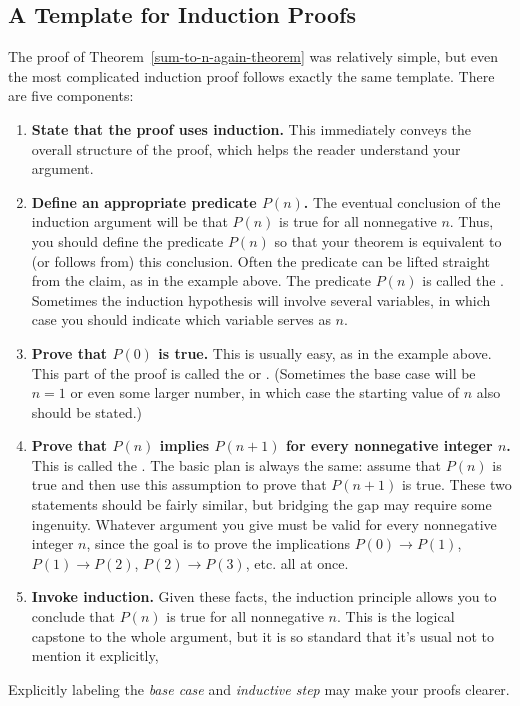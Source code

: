 \iffalse
In effect, we've just proved
that $P(0)$ implies $P(1)$, $P(1)$ implies $P(2)$, $P(2)$ implies
$P(3)$, etc., all in one fell swoop.
\fi

\subsection{A Template for Induction Proofs}
\label{templ-induct-proofs}

The proof of Theorem~\ref{sum-to-n-again-theorem} was relatively simple,
but even the most complicated induction proof follows exactly the same
template.  There are five components:

\begin{enumerate}

\item \textbf{State that the proof uses induction.}  This immediately
conveys the overall structure of the proof, which helps the reader
understand your argument.

\item \textbf{Define an appropriate predicate $P(n)$.}  The eventual
  conclusion of the induction argument will be that $P(n)$ is true for all
  nonnegative $n$.  Thus, you should define the predicate $P(n)$ so that
  your theorem is equivalent to (or follows from) this conclusion.  Often
  the predicate can be lifted straight from the claim, as in the example
  above.  The predicate $P(n)$ is called the .
  Sometimes the induction hypothesis will involve several variables, in
  which case you should indicate which variable serves as $n$.

\item \textbf{Prove that $P(0)$ is true.}  This is usually easy, as in the
  example above.  This part of the proof is called the 
  or .  (Sometimes the base case will be $n=1$ or even
  some larger number, in which case the starting value of $n$ also should
  be stated.)

\item \textbf{Prove that $P(n)$ implies $P(n+1)$ for every nonnegative
    integer $n$.}  This is called the .  The basic
  plan is always the same: assume that $P(n)$ is true and then use this
  assumption to prove that $P(n+1)$ is true.  These two statements should
  be fairly similar, but bridging the gap may require some ingenuity.
  Whatever argument you give must be valid for every nonnegative integer
  $n$, since the goal is to prove the implications $P(0) \rightarrow
  P(1)$, $P(1) \rightarrow P(2)$, $P(2) \rightarrow P(3)$, etc. all at
  once.

\item \textbf{Invoke induction.}  Given these facts, the induction
  principle allows you to conclude that $P(n)$ is true for all nonnegative
  $n$.  This is the logical capstone to the whole argument, but it is so
  standard that it's usual not to mention it explicitly,

\end{enumerate}
%
Explicitly labeling the \emph{base case} and \emph{inductive step} may
make your proofs clearer.

